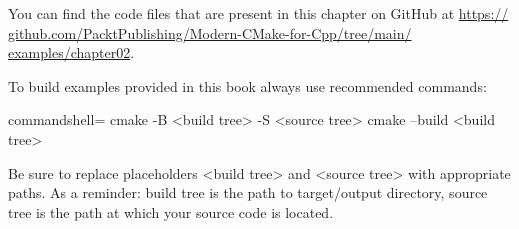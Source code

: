 You can find the code files that are present in this chapter on GitHub at \url{https:// github.com/PacktPublishing/Modern-CMake-for-Cpp/tree/main/ examples/chapter02}.

To build examples provided in this book always use recommended commands:

\begin{tcblisting}{commandshell={}}
cmake -B <build tree> -S <source tree>
cmake --build <build tree>
\end{tcblisting}

Be sure to replace placeholders <build tree> and <source tree> with appropriate paths. As a reminder: build tree is the path to target/output directory, source tree is the path at which your source code is located.
















